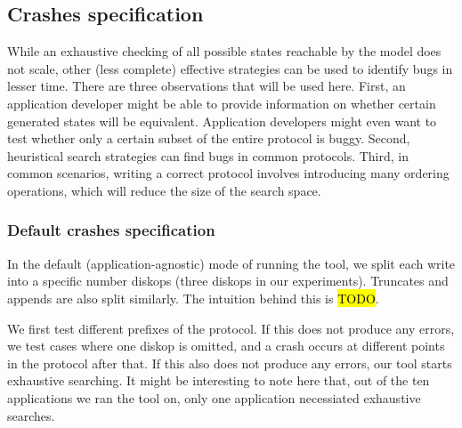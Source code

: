 \subsection{Crashes specification}
While an exhaustive checking of all possible states reachable by the model does not scale, other (less complete) effective strategies can be used to identify bugs in lesser time. There are three observations that will be used here. First, an application developer might be able to provide information on whether certain generated states will be equivalent. Application developers might even want to test whether only a certain subset of the entire protocol is buggy. Second, heuristical search strategies can find bugs in common protocols. Third, in common scenarios, writing a correct protocol involves introducing many ordering operations, which will reduce the size of the search space.



\subsubsection{Default crashes specification}
In the default (application-agnostic) mode of running the tool, we split each write into a specific number diskops (three diskops in our experiments). Truncates and appends are also split similarly. The intuition behind this is \hl{TODO}.

We first test different prefixes of the protocol. If this does not produce any errors, we test cases where one diskop is omitted, and a crash occurs at different points in the protocol after that. If this also does not produce any errors, our tool starts exhaustive searching. It might be interesting to note here that, out of the ten applications we ran the tool on, only one application necessiated exhaustive searches.

